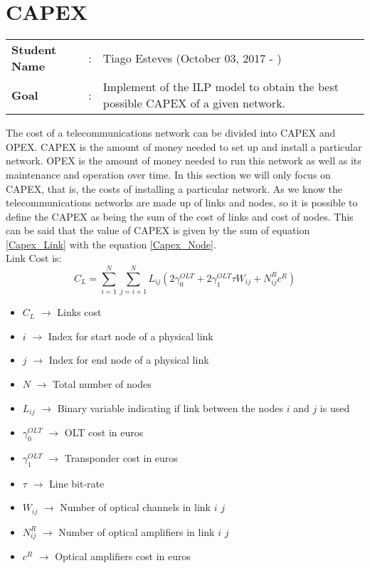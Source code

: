 \clearpage

\section{CAPEX}
\begin{tcolorbox}	
\begin{tabular}{p{2.75cm} p{0.2cm} p{10.5cm}} 	
\textbf{Student Name}  &:& Tiago Esteves    (October 03, 2017 - )\\
\textbf{Goal}          &:& Implement of the ILP model to obtain the best possible CAPEX of a given network.
\end{tabular}
\end{tcolorbox}
\vspace{11pt}

The cost of a telecommunications network can be divided into CAPEX and OPEX.
CAPEX is the amount of money needed to set up and install a particular network.
OPEX is the amount of money needed to run this network as well as its maintenance and operation over time.
In this section we will only focus on CAPEX, that is, the costs of installing a particular network.
As we know the telecommunications networks are made up of links and nodes, so it is possible to define the CAPEX as being the sum of the cost of links and cost of nodes.
This can be said that the value of CAPEX is given by the sum of equation \ref{Capex_Link} with the equation \ref{Capex_Node}.\\

Link Cost is:\\

\begin{equation}
C_L = \sum_{i=1}^N \sum_{j=i+1}^N L_{ij} \left(2 \gamma_0^{OLT} + 2 \gamma_1^{OLT} \tau W_{ij} + N^R_{ij} c^R \right)
\label{Capex_Link}
\end{equation}


\vspace{10pt}
\begin{itemize}
\item{$C_L$				$\rightarrow$	Links cost}
\item{$i$               $\rightarrow$   Index for start node of a physical link}
\item{$j$               $\rightarrow$   Index for end node of a physical link}
\item{$N$				$\rightarrow$	Total number of nodes}
\item{$L_{ij}$			$\rightarrow$	Binary variable indicating if link between the nodes $i$ and $j$ is used}
\item{$\gamma_0^{OLT}$	$\rightarrow$	OLT cost in euros}
\item{$\gamma_1^{OLT}$	$\rightarrow$	Transponder cost in euros}
\item{$\tau$		    $\rightarrow$	Line bit-rate}
\item{$W_{ij}$          $\rightarrow$   Number of optical channels in link $i$ $j$}
\item{$N^R_{ij}$    	$\rightarrow$	Number of optical amplifiers in link $i$ $j$}
\item{$c^R$				$\rightarrow$	Optical amplifiers cost in euros}
\end{itemize}


